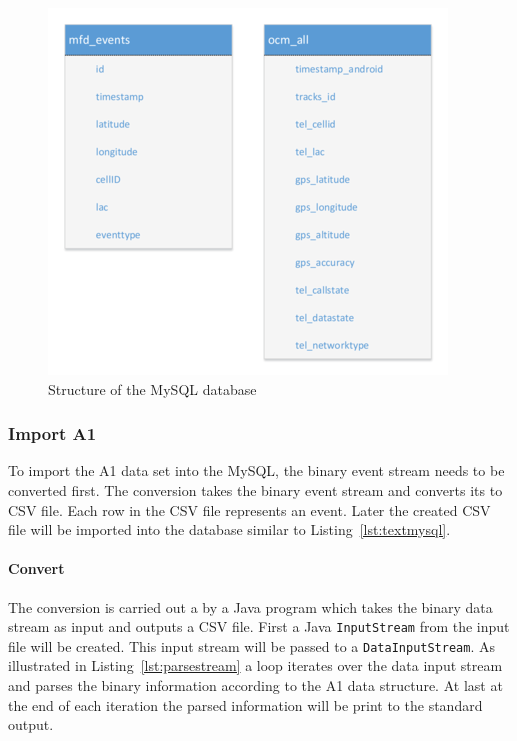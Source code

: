 \documentclass[master,english]{hgbthesis}
\begin{document}
\begin{figure}

\centering

\includegraphics[width=0.7\linewidth]{./images/mysql_structure.png}

\caption{Structure of the MySQL database}

\label{fig:mysql_structure}

\end{figure}

\subsubsection{Import A1}

To import the A1 data set into the MySQL, the binary event stream needs to be converted first. The conversion takes the binary event stream and converts its to CSV file. Each row in the CSV file represents an event. Later the created CSV file will be imported into the database similar to Listing~\ref{lst:textmysql}.

\paragraph{Convert}

The conversion is carried out a by a Java program which takes the binary data stream as input and outputs a CSV file. First a Java \verb|InputStream| from the input file will be created. This input stream will be passed to a \verb|DataInputStream|. As illustrated in Listing~\ref{lst:parsestream} a loop iterates over the data input stream and parses the binary information according to the A1 data structure. At last at the end of each iteration the parsed information will be print to the standard output.
\end{document}
